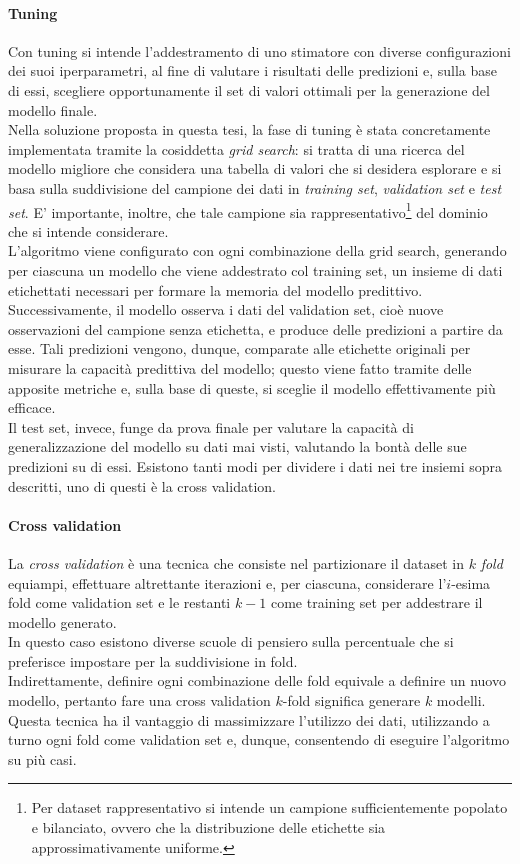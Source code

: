 \documentclass[12pt]{report}
\theoremstyle{definition}
\begin{document}
\paragraph{Tuning} Con tuning si intende l'addestramento di uno stimatore con diverse configurazioni dei suoi iperparametri, al fine di valutare i risultati delle predizioni e, sulla base di essi, scegliere opportunamente il set di valori ottimali per la generazione del modello finale.
\\
Nella soluzione proposta in questa tesi, la fase di tuning è stata concretamente implementata tramite la cosiddetta \textit{grid search}: si tratta di una ricerca del modello migliore che considera una tabella di valori che si desidera esplorare e si basa sulla suddivisione del campione dei dati in \textit{training set}, \textit{validation set} e \textit{test set}.
E' importante, inoltre, che tale campione sia rappresentativo\footnote{Per dataset rappresentativo si intende un campione sufficientemente popolato e bilanciato, ovvero che la distribuzione delle etichette sia approssimativamente uniforme.} del dominio che si intende considerare.
\\
L'algoritmo viene configurato con ogni combinazione della grid search, generando per ciascuna un modello che viene addestrato col training set, un insieme di dati etichettati necessari per formare la memoria del modello predittivo. Successivamente, il modello osserva i dati del validation set, cioè nuove osservazioni del campione senza etichetta, e produce delle predizioni a partire da esse. Tali predizioni vengono, dunque, comparate alle etichette originali per misurare la capacità predittiva del modello; questo viene fatto tramite delle apposite metriche e, sulla base di queste, si sceglie il modello effettivamente più efficace.
\\
Il test set, invece, funge da prova finale per valutare la capacità di generalizzazione del modello su dati mai visti, valutando la bontà delle sue predizioni su di essi.
Esistono tanti modi per dividere i dati nei tre insiemi sopra descritti, uno di questi è la cross validation.


\paragraph{Cross validation} 
La \textit{cross validation} è una tecnica che consiste nel partizionare il dataset in $k$ \textit{fold} equiampi, effettuare altrettante iterazioni e, per ciascuna, considerare l'$i$-esima fold come validation set e le restanti $k-1$ come training set per addestrare il modello generato.
\\
In questo caso esistono diverse scuole di pensiero sulla percentuale che si preferisce impostare per la suddivisione in fold.
\\
Indirettamente, definire ogni combinazione delle fold equivale a definire un nuovo modello, pertanto fare una cross validation $k$-fold significa generare $k$ modelli.
\\
Questa tecnica ha il vantaggio di massimizzare l'utilizzo dei dati, utilizzando a turno ogni fold come validation set e, dunque, consentendo di eseguire l'algoritmo su più casi.
\end{document}
